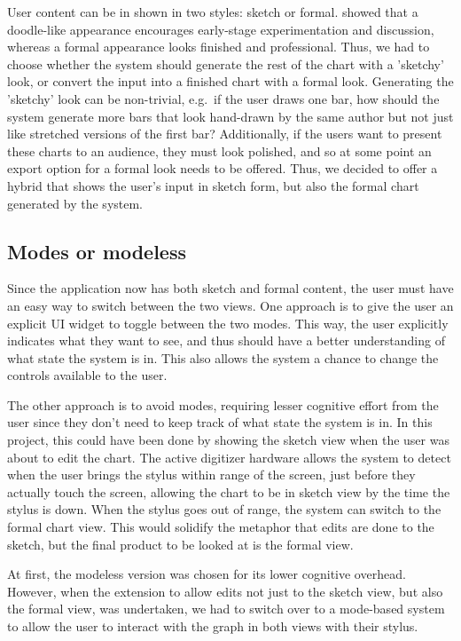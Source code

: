 	User content can be in shown in two styles: sketch or formal. \citep{Yeung1990} showed that a doodle-like appearance encourages early-stage experimentation and discussion, whereas a formal appearance looks finished and professional. Thus, we had to choose whether the system should generate the rest of the chart with a 'sketchy' look, or convert the input into a finished chart with a formal look. Generating the 'sketchy' look can be non-trivial, \citep{Plimmer2010, Wang2011} e.g.\ if the user draws one bar, how should the system generate more bars that look hand-drawn by the same author but not just like stretched versions of the first bar? Additionally, if the users want to present these charts to an audience, they must look polished, and so at some point an export option for a formal look needs to be offered. Thus, we decided to offer a hybrid that shows the user's input in sketch form, but also the formal chart generated by the system.
	
	\subsection{Modes or modeless}
	Since the application now has both sketch and formal content, the user must have an easy way to switch between the two views. One approach is to give the user an explicit UI widget to toggle between the two modes. This way, the user explicitly indicates what they want to see, and thus should have a better understanding of what state the system is in. This also allows the system a chance to change the controls available to the user.
	
	The other approach is to avoid modes, requiring lesser cognitive effort from the user since they don't need to keep track of what state the system is in. In this project, this could have been done by showing the sketch view when the user was about to edit the chart. The active digitizer hardware allows the system to detect when the user brings the stylus within range of the screen, just before they actually touch the screen, allowing the chart to be in sketch view by the time the stylus is down. When the stylus goes out of range, the system can switch to the formal chart view. This would solidify the metaphor that edits are done to the sketch, but the final product to be looked at is the formal view. 
	
	At first, the modeless version was chosen for its lower cognitive overhead. However, when the extension to allow edits not just to the sketch view, but also the formal view, was undertaken, we had to switch over to a mode-based system to allow the user to interact with the graph in both views with their stylus.
	
